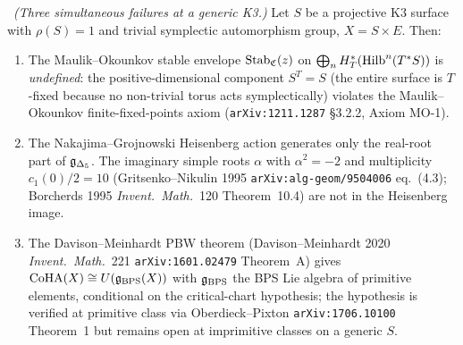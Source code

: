 \ClaimStatusTheorem\ \emph{(Three simultaneous failures at a generic
K3.)} Let $S$ be a projective K$3$ surface with $\rho(S) = 1$ and
trivial symplectic automorphism group, $X = S \times E$.
Then:
\begin{enumerate}[label=\textup{(\alph*)}]
\item The Maulik--Okounkov stable envelope
$\mathrm{Stab}_{\mathfrak{C}}(z)$ on
$\bigoplus_n H^*_T(\mathrm{Hilb}^n(T^*S))$ is \emph{undefined}: the
positive-dimensional component $S^T = S$ (the entire surface
is $T$-fixed because no non-trivial torus acts symplectically)
violates the Maulik--Okounkov finite-fixed-points axiom
(\texttt{arXiv:1211.1287} \S3.2.2, Axiom MO-1).
\item The Nakajima--Grojnowski Heisenberg action generates only the
real-root part of $\mathfrak{g}_{\Delta_5}$. The imaginary simple roots
$\alpha$ with $\alpha^2 = -2$ and multiplicity
$c_1(0)/2 = 10$ (Gritsenko--Nikulin 1995
\texttt{arXiv:alg-geom/9504006} eq.~(4.3); Borcherds 1995
\emph{Invent.\ Math.}\ 120 Theorem~10.4) are not in the
Heisenberg image.
\item The Davison--Meinhardt PBW theorem
(Davison--Meinhardt 2020 \emph{Invent.\ Math.}\ 221
\texttt{arXiv:1601.02479} Theorem~A) gives
$\mathrm{CoHA}(X) \cong U(\mathfrak{g}_{\mathrm{BPS}}(X))$ with $\mathfrak{g}_{\mathrm{BPS}}$ the
BPS Lie algebra of primitive elements, conditional on the
critical-chart hypothesis; the hypothesis is verified at
primitive class via Oberdieck--Pixton
\texttt{arXiv:1706.10100} Theorem~1 but remains open at
imprimitive classes on a generic $S$.
\end{enumerate}

